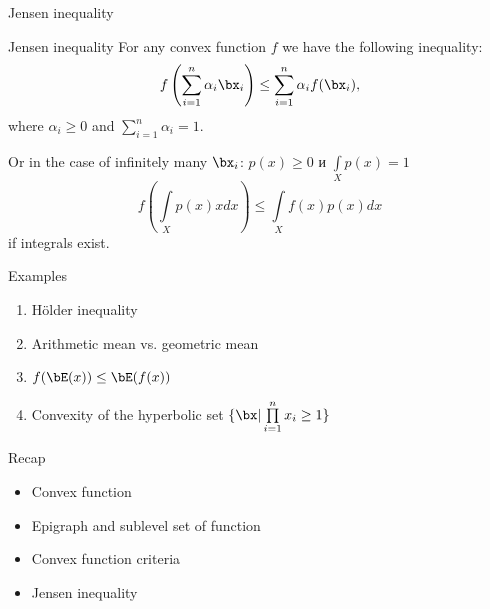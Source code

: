\documentclass[12pt]{beamer}
\begin{document}
\begin{frame}{Jensen inequality}
 
\begin{block}{Jensen inequality}
For any convex function $f$ we have the following inequality:
\vspace{-4mm}
\[
f\left( \sum\limits_{i=1}^n \alpha_i \bx_i \right) \leq \sum\limits_{i=1}^n \alpha_i f(\bx_i),
\vspace{-4mm}
\] 
where $\alpha_i \geq 0$ and $\sum\limits_{i=1}^n \alpha_i = 1$.
\end{block}
Or in the case of infinitely many $\bx_i$: $p(x) \geq 0$ и $\int\limits_X p(x) = 1$ 
\vspace{-4mm}
\[
f\left( \int\limits_X p(x)xdx \right) \leq \int\limits_X f(x)p(x)dx
\]
if integrals exist.

\end{frame}

\begin{frame}{Examples}
\begin{enumerate}
\item H{\"o}lder inequality 
\item Arithmetic mean vs. geometric mean
\item $f(\bE(x)) \leq \bE(f(x))$
\item Convexity of the hyperbolic set $\{ \bx | \prod\limits_{i=1}^n x_i \geq 1 \}$
\end{enumerate}
\end{frame}

\begin{frame}{Recap}
\begin{itemize}
\item Convex function
\item Epigraph and sublevel set of function 
\item Convex function criteria
\item Jensen inequality
\end{itemize}
\end{frame}
\end{document}
